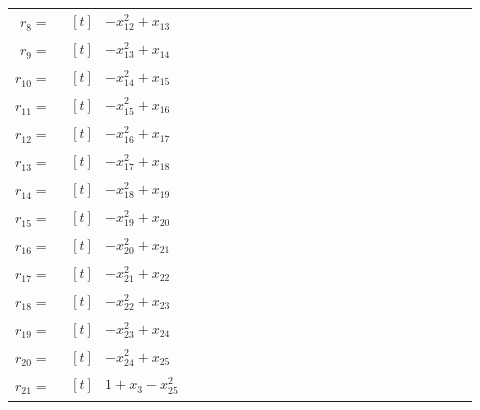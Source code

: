 \begin{longtable}{@{}r p{0.92\linewidth}@{}}
$r_{8}=$ & $\begin{aligned}[t]&-x_{12}^{2}+x_{13}\end{aligned}$ \\[2pt]
$r_{9}=$ & $\begin{aligned}[t]&-x_{13}^{2}+x_{14}\end{aligned}$ \\[2pt]
$r_{10}=$ & $\begin{aligned}[t]&-x_{14}^{2}+x_{15}\end{aligned}$ \\[2pt]
$r_{11}=$ & $\begin{aligned}[t]&-x_{15}^{2}+x_{16}\end{aligned}$ \\[2pt]
$r_{12}=$ & $\begin{aligned}[t]&-x_{16}^{2}+x_{17}\end{aligned}$ \\[2pt]
$r_{13}=$ & $\begin{aligned}[t]&-x_{17}^{2}+x_{18}\end{aligned}$ \\[2pt]
$r_{14}=$ & $\begin{aligned}[t]&-x_{18}^{2}+x_{19}\end{aligned}$ \\[2pt]
$r_{15}=$ & $\begin{aligned}[t]&-x_{19}^{2}+x_{20}\end{aligned}$ \\[2pt]
$r_{16}=$ & $\begin{aligned}[t]&-x_{20}^{2}+x_{21}\end{aligned}$ \\[2pt]
$r_{17}=$ & $\begin{aligned}[t]&-x_{21}^{2}+x_{22}\end{aligned}$ \\[2pt]
$r_{18}=$ & $\begin{aligned}[t]&-x_{22}^{2}+x_{23}\end{aligned}$ \\[2pt]
$r_{19}=$ & $\begin{aligned}[t]&-x_{23}^{2}+x_{24}\end{aligned}$ \\[2pt]
$r_{20}=$ & $\begin{aligned}[t]&-x_{24}^{2}+x_{25}\end{aligned}$ \\[2pt]
$r_{21}=$ & $\begin{aligned}[t]&1+x_{3}-x_{25}^{2}\end{aligned}$ \\[2pt]

\end{longtable}
